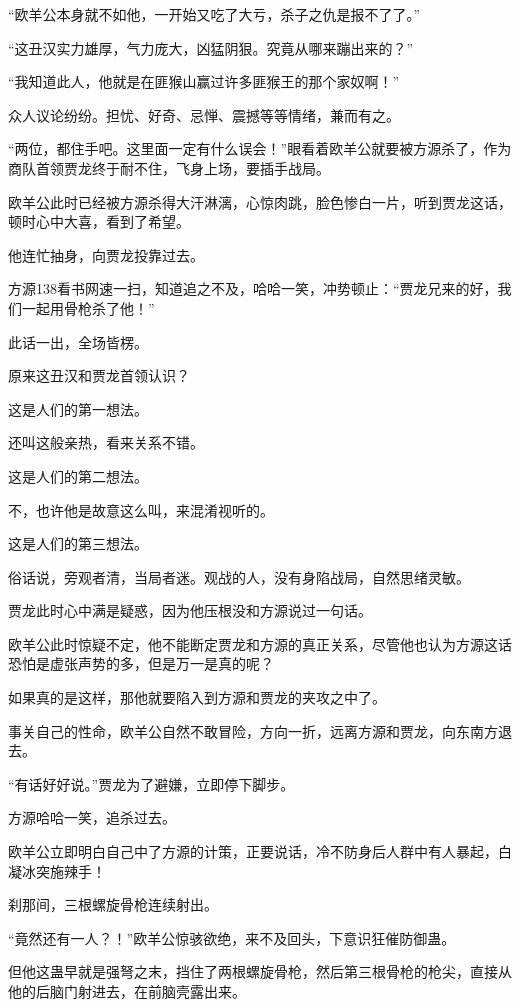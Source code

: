 \begin{this_body}
“欧羊公本身就不如他，一开始又吃了大亏，杀子之仇是报不了了。”

“这丑汉实力雄厚，气力庞大，凶猛阴狠。究竟从哪来蹦出来的？”

“我知道此人，他就是在匪猴山赢过许多匪猴王的那个家奴啊！”

众人议论纷纷。担忧、好奇、忌惮、震撼等等情绪，兼而有之。

“两位，都住手吧。这里面一定有什么误会！”眼看着欧羊公就要被方源杀了，作为商队首领贾龙终于耐不住，飞身上场，要插手战局。

欧羊公此时已经被方源杀得大汗淋漓，心惊肉跳，脸色惨白一片，听到贾龙这话，顿时心中大喜，看到了希望。

他连忙抽身，向贾龙投靠过去。

方源138看书网速一扫，知道追之不及，哈哈一笑，冲势顿止：“贾龙兄来的好，我们一起用骨枪杀了他！”

此话一出，全场皆楞。

原来这丑汉和贾龙首领认识？

这是人们的第一想法。

还叫这般亲热，看来关系不错。

这是人们的第二想法。

不，也许他是故意这么叫，来混淆视听的。

这是人们的第三想法。

俗话说，旁观者清，当局者迷。观战的人，没有身陷战局，自然思绪灵敏。

贾龙此时心中满是疑惑，因为他压根没和方源说过一句话。

欧羊公此时惊疑不定，他不能断定贾龙和方源的真正关系，尽管他也认为方源这话恐怕是虚张声势的多，但是万一是真的呢？

如果真的是这样，那他就要陷入到方源和贾龙的夹攻之中了。

事关自己的性命，欧羊公自然不敢冒险，方向一折，远离方源和贾龙，向东南方退去。

“有话好好说。”贾龙为了避嫌，立即停下脚步。

方源哈哈一笑，追杀过去。

欧羊公立即明白自己中了方源的计策，正要说话，冷不防身后人群中有人暴起，白凝冰突施辣手！

刹那间，三根螺旋骨枪连续射出。

“竟然还有一人？！”欧羊公惊骇欲绝，来不及回头，下意识狂催防御蛊。

但他这蛊早就是强弩之末，挡住了两根螺旋骨枪，然后第三根骨枪的枪尖，直接从他的后脑门射进去，在前脑壳露出来。


\end{this_body}
